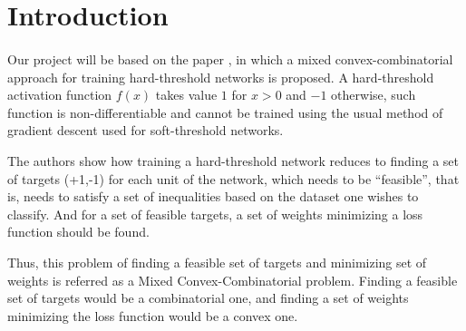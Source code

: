 \section{Introduction}
\paragraph{}
Our project will be based on the paper \cite{Friesen}, in which a mixed convex-combinatorial approach for training hard-threshold networks is proposed. A hard-threshold activation function $f(x)$ takes value $1$ for $x > 0$ and $-1$ otherwise, such function is non-differentiable and cannot be trained using the usual method of gradient descent used for soft-threshold networks.

The authors show how training a hard-threshold network reduces to finding a set of targets (+1,-1) for each unit of the network, which needs to be ``feasible'', that is, needs to satisfy a set of inequalities based on the dataset one wishes to classify. And for a set of feasible targets, a set of weights minimizing a loss function should be found.

Thus, this problem of finding a feasible set of targets and minimizing set of weights is referred as a Mixed Convex-Combinatorial problem. Finding a feasible set of targets would be a combinatorial one, and finding a set of weights minimizing the loss function would be a convex one.
